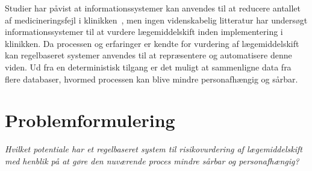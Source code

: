 Studier har påvist at informationssystemer kan anvendes til at reducere antallet af medicineringsfejl i klinikken~\citep{Agrawal2009, Stenner2010, Fischer2008, Simpson2008}, men ingen videnskabelig litteratur har undersøgt informationssystemer til at vurdere lægemiddelskift inden implementering i klinikken. Da processen og erfaringer er kendte for vurdering af lægemiddelskift kan regelbaseret systemer anvendes til at repræsentere og automatisere denne viden. Ud fra en deterministisk tilgang er det muligt at sammenligne data fra flere databaser, hvormed processen kan blive mindre personafhængig og sårbar.




\section{Problemformulering}
\textit{Hvilket potentiale har et regelbaseret system til risikovurdering af lægemiddelskift med henblik på at gøre den nuværende proces mindre sårbar og personafhængig?}




